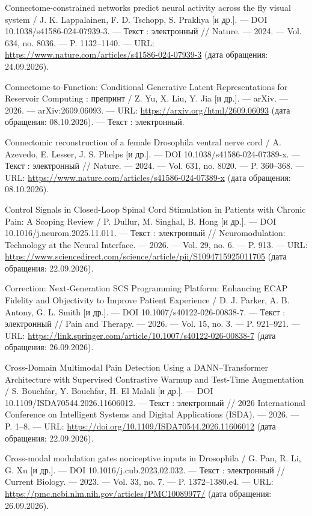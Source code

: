 \begin{list}{}{\setlength{\leftmargin}{10mm}\setlength{\labelwidth}{8mm}\setlength{\labelsep}{2mm}\setlength{\itemsep}{0pt}\setlength{\parsep}{0pt}\setlength{\topsep}{0pt}}
\item[70.] Connectome-constrained networks predict neural activity across the fly visual system / J. K. Lappalainen, F. D. Tschopp, S. Prakhya [и др.]. — DOI 10.1038/s41586-024-07939-3. — Текст : электронный // Nature. — 2024. — Vol. 634, no. 8036. — P. 1132–1140. — URL: \url{https://www.nature.com/articles/s41586-024-07939-3} (дата обращения: 24.09.2026).
\item[71.] Connectome-to-Function: Conditional Generative Latent Representations for Reservoir Computing : препринт / Z. Yu, X. Liu, Y. Jia [и др.]. — arXiv. — 2026. — arXiv:2609.06093. — URL: \url{https://arxiv.org/html/2609.06093} (дата обращения: 08.10.2026). — Текст : электронный.
\item[72.] Connectomic reconstruction of a female Drosophila ventral nerve cord / A. Azevedo, E. Lesser, J. S. Phelps [и др.]. — DOI 10.1038/s41586-024-07389-x. — Текст : электронный // Nature. — 2024. — Vol. 631, no. 8020. — P. 360–368. — URL: \url{https://www.nature.com/articles/s41586-024-07389-x} (дата обращения: 08.10.2026).
\item[73.] Control Signals in Closed-Loop Spinal Cord Stimulation in Patients with Chronic Pain: A Scoping Review / P. Dullur, M. Singhal, B. Hong [и др.]. — DOI 10.1016/j.neurom.2025.11.011. — Текст : электронный // Neuromodulation: Technology at the Neural Interface. — 2026. — Vol. 29, no. 6. — P. 913. — URL: \url{https://www.sciencedirect.com/science/article/pii/S1094715925011705} (дата обращения: 22.09.2026).
\item[74.] Correction: Next‑Generation SCS Programming Platform: Enhancing ECAP Fidelity and Objectivity to Improve Patient Experience / D. J. Parker, A. B. Antony, G. L. Smith [и др.]. — DOI 10.1007/s40122-026-00838-7. — Текст : электронный // Pain and Therapy. — 2026. — Vol. 15, no. 3. — P. 921–921. — URL: \url{https://link.springer.com/article/10.1007/s40122-026-00838-7} (дата обращения: 26.09.2026).
\item[75.] Cross-Domain Multimodal Pain Detection Using a DANN–Transformer Architecture with Supervised Contrastive Warmup and Test-Time Augmentation / S. Bouchfar, Y. Bouchfar, H. El Malali [и др.]. — DOI 10.1109/ISDA70544.2026.11606012. — Текст : электронный // 2026 International Conference on Intelligent Systems and Digital Applications (ISDA). — 2026. — P. 1–8. — URL: \url{https://doi.org/10.1109/ISDA70544.2026.11606012} (дата обращения: 22.09.2026).
\item[76.] Cross-modal modulation gates nociceptive inputs in Drosophila / G. Pan, R. Li, G. Xu [и др.]. — DOI 10.1016/j.cub.2023.02.032. — Текст : электронный // Current Biology. — 2023. — Vol. 33, no. 7. — P. 1372–1380.e4. — URL: \url{https://pmc.ncbi.nlm.nih.gov/articles/PMC10089977/} (дата обращения: 26.09.2026).

\end{list}
